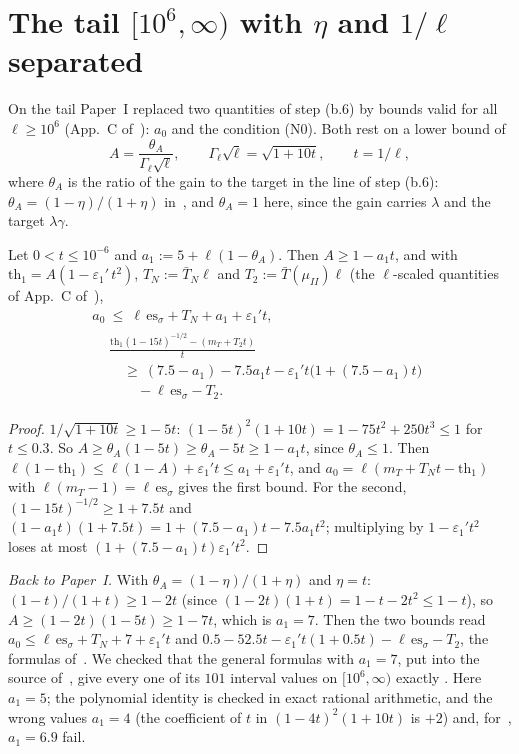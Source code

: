 \section{\texorpdfstring{The tail $[10^6,\infty)$ with $\eta$ and $1/\ell$ separated}{The tail with eta and 1/ell separated}}
\label{app:C}

On the tail Paper~I replaced two quantities of step (b.6) by bounds valid for all $\ell\ge10^6$ (App.~C of~\cite{I}): $a_0$ and the condition (N0).
Both rest on a lower bound of
\begin{equation}
A=\frac{\theta_A}{\Gamma_\ell\sqrt\ell},\qquad \Gamma_\ell\sqrt\ell=\sqrt{1+10t},\qquad t=1/\ell,
\end{equation}
where $\theta_A$ is the ratio of the gain to the target in the line of step (b.6): $\theta_A=(1-\eta)/(1+\eta)$ in~\cite{I}, and $\theta_A=1$ here, since the gain carries $\lambda$ and the target $\lambda\gamma$.

\begin{lemma} \proofst
Let $0<t\le10^{-6}$ and $a_1:=5+\ell(1-\theta_A)$.
Then $A\ge1-a_1t$, and with $\mathrm{th}_1=A(1-\varepsilon_1'\,t^2)$, $T_N:=\bar T_N\ell$ and $T_2:=\bar T(\mu_{II})\ell$ (the $\ell$-scaled quantities of App.~C of~\cite{I}),
\begin{gather}
a_0\ \le\ \ell\,\mathrm{es}_\sigma+T_N+a_1+\varepsilon_1't,\\
\begin{split}
&\frac{\mathrm{th}_1(1-15t)^{-1/2}-(m_T+T_2t)}{t}\\
&\quad\ge\ (7.5-a_1)-7.5a_1t-\varepsilon_1't\bigl(1+(7.5-a_1)t\bigr)\\
&\qquad-\ell\,\mathrm{es}_\sigma-T_2.
\end{split}
\end{gather}
\end{lemma}

\begin{proof}
$1/\sqrt{1+10t}\ge1-5t$: $(1-5t)^2(1+10t)=1-75t^2+250t^3\le1$ for $t\le0.3$.
So $A\ge\theta_A(1-5t)\ge\theta_A-5t\ge1-a_1t$, since $\theta_A\le1$.
Then $\ell(1-\mathrm{th}_1)\le\ell(1-A)+\varepsilon_1't\le a_1+\varepsilon_1't$, and $a_0=\ell(m_T+T_Nt-\mathrm{th}_1)$ with $\ell(m_T-1)=\ell\,\mathrm{es}_\sigma$ gives the first bound.
For the second, $(1-15t)^{-1/2}\ge1+7.5t$ and $(1-a_1t)(1+7.5t)=1+(7.5-a_1)t-7.5a_1t^2$; multiplying by $1-\varepsilon_1't^2$ loses at most $(1+(7.5-a_1)t)\varepsilon_1't^2$.
\end{proof}

\emph{Back to Paper~I.}
With $\theta_A=(1-\eta)/(1+\eta)$ and $\eta=t$: $(1-t)/(1+t)\ge1-2t$ (since $(1-2t)(1+t)=1-t-2t^2\le1-t$), so $A\ge(1-2t)(1-5t)\ge1-7t$, which is $a_1=7$.
Then the two bounds read $a_0\le\ell\,\mathrm{es}_\sigma+T_N+7+\varepsilon_1't$ and $0.5-52.5t-\varepsilon_1't(1+0.5t)-\ell\,\mathrm{es}_\sigma-T_2$, the formulas of~\cite{I}.
We checked that the general formulas with $a_1=7$, put into the source of~\cite{I}, give every one of its $101$ interval values on $[10^6,\infty)$ exactly .
Here $a_1=5$; the polynomial identity is checked in exact rational arithmetic, and the wrong values $a_1=4$ (the coefficient of $t$ in $(1-4t)^2(1+10t)$ is $+2$) and, for~\cite{I}, $a_1=6.9$ fail.

